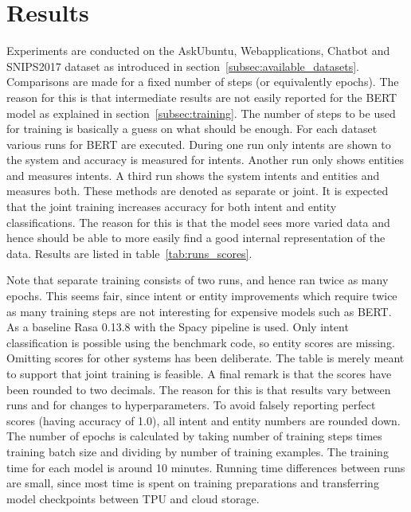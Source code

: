 \section{Results}
\label{sec:results}

Experiments are conducted on the AskUbuntu, Webapplications, Chatbot and SNIPS2017 dataset as introduced in section~\ref{subsec:available_datasets}.
Comparisons are made for a fixed number of steps (or equivalently epochs).
The reason for this is that intermediate results are not easily reported for the BERT model as explained in section~\ref{subsec:training}.
The number of steps to be used for training is basically a guess on what should be enough.
For each dataset various runs for BERT are executed.
During one run only intents are shown to the system and accuracy is measured for intents.
Another run only shows entities and measures intents.
A third run shows the system intents and entities and measures both.
These methods are denoted as separate or joint.
It is expected that the joint training increases accuracy for both intent and entity classifications.
The reason for this is that the model sees more varied data and hence should be able to more easily find a good internal representation of the data.
Results are listed in table~\ref{tab:runs_scores}.

Note that separate training consists of two runs, and hence ran twice as many epochs.
This seems fair, since intent or entity improvements which require twice as many training steps are not interesting for expensive models such as BERT.
As a baseline Rasa 0.13.8 with the Spacy pipeline is used.
Only intent classification is possible using the benchmark code, so entity scores are missing.
Omitting scores for other systems has been deliberate.
The table is merely meant to support that joint training is feasible.
A final remark is that the scores have been rounded to two decimals.
The reason for this is that results vary between runs and for changes to hyperparameters.
To avoid falsely reporting perfect scores (having accuracy of 1.0), all intent and entity numbers are rounded down.
The number of epochs is calculated by taking number of training steps times training batch size and dividing by number of training examples.
The training time for each model is around 10 minutes.
Running time differences between runs are small, since most time is spent on training preparations and transferring model checkpoints between TPU and cloud storage.

